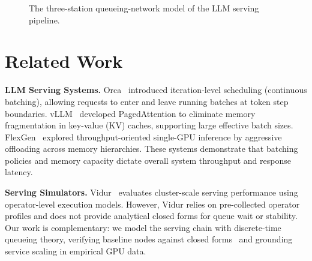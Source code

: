 \documentclass[conference]{IEEEtran}
\begin{document}
\begin{figure}[t]
\centering
{}
\caption{The three-station queueing-network model of the LLM serving pipeline.}
\label{fig:network_model}
\vspace{-0.3cm}
\end{figure}

\section{Related Work}
\textbf{LLM Serving Systems.} Orca~\cite{yu2022orca} introduced iteration-level scheduling (continuous batching), allowing requests to enter and leave running batches at token step boundaries. vLLM~\cite{kwon2023vllm} developed PagedAttention to eliminate memory fragmentation in key-value (KV) caches, supporting large effective batch sizes. FlexGen~\cite{sheng2023flexgen} explored throughput-oriented single-GPU inference by aggressive offloading across memory hierarchies. These systems demonstrate that batching policies and memory capacity dictate overall system throughput and response latency.

\textbf{Serving Simulators.} Vidur~\cite{agrawal2024vidur} evaluates cluster-scale serving performance using operator-level execution models. However, Vidur relies on pre-collected operator profiles and does not provide analytical closed forms for queue wait or stability. Our work is complementary: we model the serving chain with discrete-time queueing theory, verifying baseline nodes against closed forms~\cite{mor2006discrete} and grounding service scaling in empirical GPU data.
\end{document}
